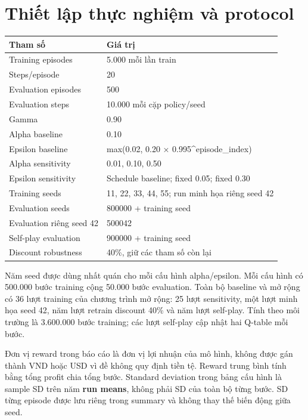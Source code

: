\section{Thiết lập thực nghiệm và
protocol}\label{thiux1ebft-lux1eadp-thux1ef1c-nghiux1ec7m-vuxe0-protocol}

{\def\LTcaptype{none} %
\begin{longtable}[]{@{}ll@{}}
\toprule\noalign{}
Tham số & Giá trị \\
\midrule\noalign{}
\endhead
\bottomrule\noalign{}
\endlastfoot
Training episodes & 5.000 mỗi lần train \\
Steps/episode & 20 \\
Evaluation episodes & 500 \\
Evaluation steps & 10.000 mỗi cặp policy/seed \\
Gamma & 0.90 \\
Alpha baseline & 0.10 \\
Epsilon baseline & max(0.02, 0.20 × 0.995\^{}episode\_index) \\
Alpha sensitivity & 0.01, 0.10, 0.50 \\
Epsilon sensitivity & Schedule baseline; fixed 0.05; fixed 0.30 \\
Training seeds & 11, 22, 33, 44, 55; run minh họa riêng seed 42 \\
Evaluation seeds & 800000 + training seed \\
Evaluation riêng seed 42 & 500042 \\
Self-play evaluation & 900000 + training seed \\
Discount robustness & 40\%, giữ các tham số còn lại \\
\end{longtable}
}

Năm seed được dùng nhất quán cho mỗi cấu hình alpha/epsilon. Mỗi cấu
hình có 500.000 bước training cộng 50.000 bước evaluation. Toàn bộ
baseline và mở rộng có 36 lượt training của chương trình mở rộng: 25
lượt sensitivity, một lượt minh họa seed 42, năm lượt retrain discount
40\% và năm lượt self-play. Tính theo môi trường là 3.600.000 bước
training; các lượt self-play cập nhật hai Q-table mỗi bước.

Đơn vị reward trong báo cáo là đơn vị lợi nhuận của mô hình, không được
gán thành VND hoặc USD vì đề không quy định tiền tệ. Reward trung bình
tính bằng tổng profit chia tổng bước. Standard deviation trong bảng cấu
hình là sample SD trên năm \textbf{run means}, không phải SD của toàn bộ
từng bước. SD từng episode được lưu riêng trong summary và không thay
thế biến động giữa seed.

